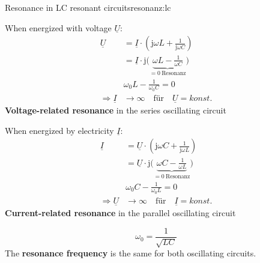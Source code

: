 \begin{frame}
{\begin{expl}{Resonance in LC resonant circuits}{resonanz:lc}
    \begin{minipage}{\textwidth}\centering%
        \begin{minipage}{0.48\textwidth}\centering%
            When energized with voltage $\underline{U}$:
            \begin{align*}
                \underline{U}
                &= \underline{I} \cdot \left(\mathrm{j}\omega L + \frac{1}{\mathrm{j}\omega C}\right) \\
                &= \underline{I} \cdot \mathrm{j}\bigg(\underbrace{\omega L - \frac{1}{\omega C}}_{=0\ \text{Resonanz}}\bigg) \\
                &\omega_0 L - \frac{1}{\omega_0 C} = 0 \\
                \Rightarrow \underline{I} &\rightarrow \infty \quad \text{für} \quad \underline{U} = konst.
            \end{align*}
            \textbf{Voltage-related resonance}\newline
            in the series oscillating circuit
        \end{minipage}\hfill%
        \begin{minipage}{0.48\textwidth}\centering%
            When energized by electricity $\underline{I}$:
            \begin{align*}
                \underline{I}
                &= \underline{U} \cdot \left(\mathrm{j}\omega C + \frac{1}{\mathrm{j}\omega L}\right) \\
                &= \underline{U} \cdot \mathrm{j} \bigg(\underbrace{\omega C - \frac{1}{\omega L}}_{=0\ \text{Resonanz}}\bigg)\\
                &\omega_0 C - \frac{1}{\omega_0 L} = 0 \\
                \Rightarrow \underline{U} &\rightarrow \infty\quad \text{für} \quad \underline{I} = konst.
            \end{align*}
            \textbf{Current-related resonance}\newline
            in the parallel oscillating circuit
        \end{minipage}

        \begin{equation*}
            \omega_0 = \frac{1}{\sqrt{LC}}
        \end{equation*}
        The \textbf{resonance frequency} is the same for both oscillating circuits.
    \end{minipage}
\end{expl}

}
\end{frame}
